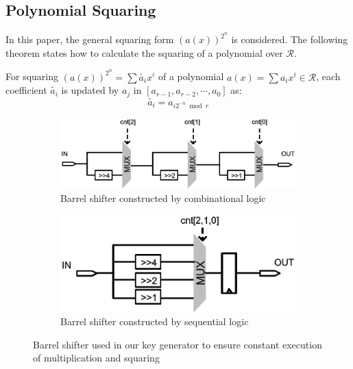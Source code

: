 \documentclass[runningheads]{llncs}
\begin{document}
\subsection{Polynomial Squaring}
\label{sub::square}
In this paper, the general squaring form $(a(x))^{2^n}$ is considered. The following theorem states how to calculate the squaring of a polynomial over $\mathcal{R}$.
\begin{theorem}
For squaring $(a(x))^{2^n}=\sum\widetilde{a_{i}}x^i$ of a polynomial $a(x)=\sum a_ix^i \in \mathcal{R}$, each coefficient $\widetilde{a_{i}}$ is updated by $a_{j}$ in $[{a_{r-1}},{a_{r-2}},\cdots,{a_0}]$ as:
\[
    \widetilde{a_{i}} = a_{i2^{-n}\bmod r}
\]
\end{theorem}

\begin{figure}[!tb]
\centering
\begin{subfigure}[t]{0.5\textwidth}\centering
\includegraphics[width=\textwidth]{./fig/barrel1.eps}
\caption{Barrel shifter constructed by combinational logic}
\label{fig:barrel1}
\end{subfigure}
\hspace{1em}
\begin{subfigure}[t]{0.4\textwidth}\centering
\includegraphics[width=\textwidth]{./fig/barrel2.eps}
\caption{Barrel shifter constructed by sequential logic}
\label{fig:barrel2}
\end{subfigure}
\caption{Barrel shifter used in our key generator to ensure constant execution of multiplication and squaring}
\end{figure}
\end{document}
